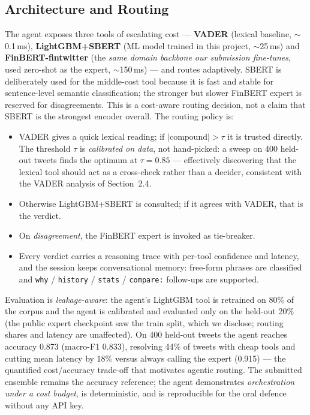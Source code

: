 \documentclass[11pt,a4paper]{article}
\newcommand{\tH}[1]{\textcolor{maincolor}{\textbf{#1}}}
\begin{document}
\subsection{Architecture and Routing}
The agent exposes three tools of escalating cost --- \tH{VADER} (lexical baseline,
$\sim$0.1\,ms), \tH{LightGBM+SBERT} (ML model trained in this project, $\sim$25\,ms) and
\tH{FinBERT-fintwitter} (the \emph{same domain backbone our submission fine-tunes}, used
zero-shot as the expert, $\sim$150\,ms) --- and routes adaptively.
SBERT is deliberately used for the middle-cost tool because it is fast and stable for
sentence-level semantic classification; the stronger but slower FinBERT expert is reserved for
disagreements. This is a cost-aware routing decision, not a claim that SBERT is the strongest
encoder overall.
The routing policy is:
\begin{itemize}
  \item VADER gives a quick lexical reading; if $|\text{compound}| > \tau$ it is trusted directly.
  The threshold $\tau$ is \emph{calibrated on data}, not hand-picked: a sweep on 400 held-out
  tweets finds the optimum at $\tau{=}0.85$ --- effectively discovering that the lexical tool
  should act as a cross-check rather than a decider, consistent with the VADER analysis of
  Section~2.4.
  \item Otherwise LightGBM+SBERT is consulted; if it agrees with VADER, that is the verdict.
  \item On \emph{disagreement}, the FinBERT expert is invoked as tie-breaker.
  \item Every verdict carries a reasoning trace with per-tool confidence and latency, and the
  session keeps conversational memory: free-form phrases are classified and \texttt{why} /
  \texttt{history} / \texttt{stats} / \texttt{compare:} follow-ups are supported.
\end{itemize}
Evaluation is \emph{leakage-aware}: the agent's LightGBM tool is retrained on 80\% of the corpus
and the agent is calibrated and evaluated only on the held-out 20\% (the public expert checkpoint
saw the train split, which we disclose; routing shares and latency are unaffected). On 400
held-out tweets the agent reaches accuracy 0.873 (macro-F1 0.833), resolving 44\% of tweets with
cheap tools and cutting mean latency by 18\% versus always calling the expert (0.915) --- the
quantified cost/accuracy trade-off that motivates agentic routing. The submitted ensemble
remains the accuracy reference; the agent demonstrates \emph{orchestration under a cost budget},
is deterministic, and is reproducible for the oral defence without any API key.
\end{document}
